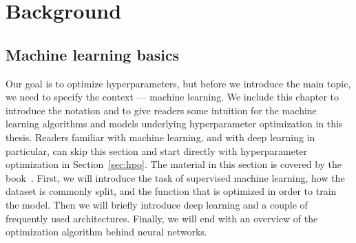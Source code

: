 \chapter{Background}

\label{chap:refs}

\section{Machine learning basics}
Our goal is to optimize hyperparameters, but before we introduce the main topic, we need to specify the context --- machine learning. We include this chapter to introduce the notation and to give readers some intuition for the machine learning algorithms and models underlying hyperparameter optimization in this thesis. Readers familiar with machine learning, and with deep learning in particular, can skip this section and start directly with hyperparameter optimization in Section~\ref{sec:hpo}. The material in this section is covered by the~ book~\cite{Goodfellow-et-al-2016}. First, we will introduce the task of supervised machine learning, how the dataset is commonly split, and the function that is optimized in order to train the model. Then we will briefly introduce deep learning and a couple of frequently used architectures. Finally, we will end with an overview of the optimization algorithm behind neural networks.






